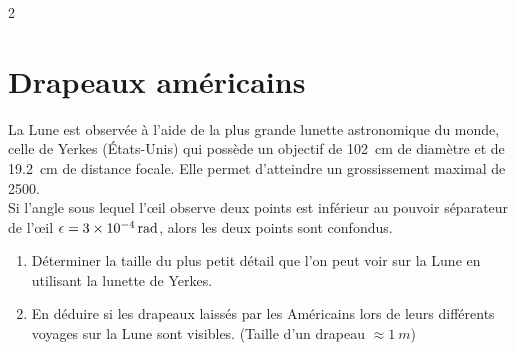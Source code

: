 \documentclass[a4paper,11pt,fleqn]{article}%
\begin{document}
\begin{multicols}{2}
\section{Drapeaux américains}
La Lune est observée à l'aide de la plus grande lunette astronomique du monde, celle de Yerkes (États-Unis) qui possède un objectif de \SI{102}{cm} de diamètre et de \SI{19,2}{cm} de distance focale. Elle permet d'atteindre un grossissement maximal de \num{2500}.\\
Si l'angle sous lequel l'\oe il observe deux points est inférieur au pouvoir séparateur de l'\oe il $\epsilon = \SI{3E-4}{\radian }$, alors les deux points sont confondus.
\begin{enumerate}
    \item Déterminer la taille du plus petit détail que l'on peut voir sur la Lune en utilisant la lunette de Yerkes.
    \item En déduire si les drapeaux laissés par les Américains lors de leurs différents voyages sur la Lune sont visibles. (Taille d'un drapeau $\approx \SI{1}{m}$)
\end{enumerate}
\end{multicols}
\end{document}
